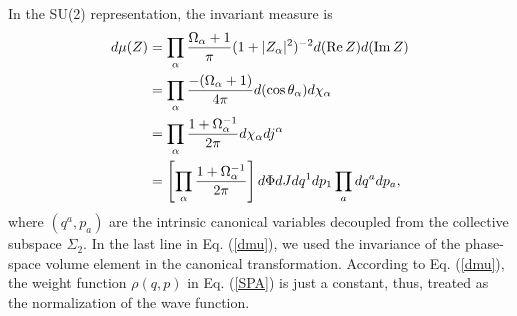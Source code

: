 \documentclass[11pt]{book} %
\begin{document}
In the SU(2) representation, the invariant measure is
\begin{align}
  d\mu(Z) &= \prod_\alpha \frac{\Omega_\alpha+1}{\pi} (1+|Z_\alpha|^2)^{-2} d({\rm Re}\,Z) d({\rm Im}\,Z) \nonumber \\
&= \prod_\alpha \frac{-(\Omega_\alpha+1)}{4\pi} d(\cos{\theta_\alpha}) d\chi_\alpha \nonumber \\
 &= \prod_\alpha \frac{1+\Omega_\alpha^{-1}}{2\pi} d\chi_\alpha dj^\alpha \nonumber \\
 &= \left[ \prod_\alpha \frac{1+\Omega_\alpha^{-1}}{2\pi} \right] d\Phi dJ dq^1 dp_1 %
  \prod_a dq^a dp_a,
	\label{dmu}
\end{align}
where $(q^a,p_a)$ are the intrinsic canonical variables
decoupled from the collective subspace $\Sigma_2$.
In the last line in Eq. (\ref{dmu}),
we used the invariance of the phase-space volume element
in the canonical transformation.
According to Eq. (\ref{dmu}),
the weight function $\rho(q,p)$ in Eq. (\ref{SPA}) is just a constant,
thus, treated as the normalization of the wave function.
\end{document}
